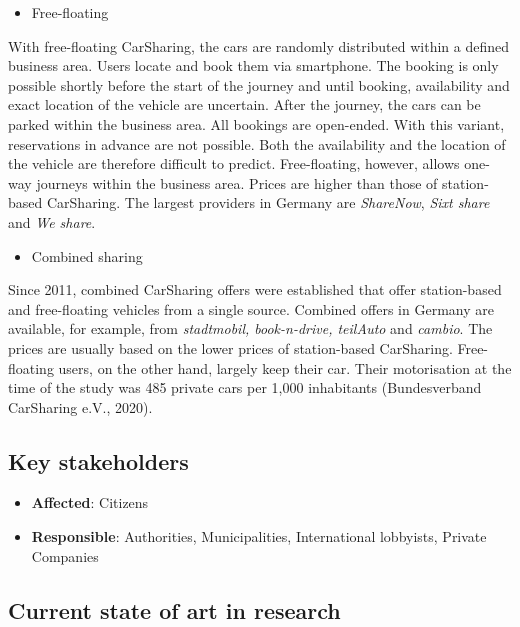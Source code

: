 \documentclass[
]{book}
\providecommand{\tightlist}{%
  \setlength{\itemsep}{0pt}\setlength{\parskip}{0pt}}
\begin{document}
\begin{itemize}
\tightlist
\item
  Free-floating
\end{itemize}

With free-floating CarSharing, the cars are randomly distributed within a defined business area. Users locate and book them via smartphone. The booking is only possible shortly before the start of the journey and until booking, availability and exact location of the vehicle are uncertain. After the journey, the cars can be parked within the business area. All bookings are open-ended. With this variant, reservations in advance are not possible. Both the availability and the location of the vehicle are therefore difficult to predict. Free-floating, however, allows one-way journeys within the business area. Prices are higher than those of station-based CarSharing. The largest providers in Germany are \emph{ShareNow}, \emph{Sixt share} and \emph{We share}.

\begin{itemize}
\tightlist
\item
  Combined sharing
\end{itemize}

Since 2011, combined CarSharing offers were established that offer station-based and free-floating vehicles from a single source. Combined offers in Germany are available, for example, from \emph{stadtmobil, book-n-drive, teilAuto} and \emph{cambio}. The prices are usually based on the lower prices of station-based CarSharing.
Free-floating users, on the other hand, largely keep their car. Their motorisation at the time of the study was 485 private cars per 1,000 inhabitants (Bundesverband CarSharing e.V., 2020).

\hypertarget{key-stakeholders-42}{%
\subsection*{Key stakeholders}\label{key-stakeholders-42}}

\begin{itemize}
\tightlist
\item
  \textbf{Affected}: Citizens
\item
  \textbf{Responsible}: Authorities, Municipalities, International lobbyists, Private Companies
\end{itemize}

\hypertarget{current-state-of-art-in-research-42}{%
\subsection*{Current state of art in research}\label{current-state-of-art-in-research-42}}
\end{document}
